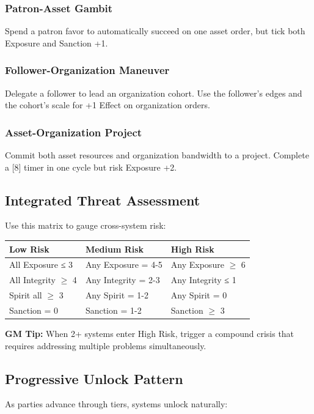 \documentclass[10pt]{article}
\begin{document}
    \subsubsection{Patron-Asset Gambit}
    Spend a patron favor to automatically succeed on one asset order, but tick both Exposure and Sanction +1.
    
    \subsubsection{Follower-Organization Maneuver}
    Delegate a follower to lead an organization cohort. Use the follower's edges and the cohort's scale for +1 Effect on organization orders.
    
    \subsubsection{Asset-Organization Project}
    Commit both asset resources and organization bandwidth to a project. Complete a [8] timer in one cycle but risk Exposure +2.
    
    \subsection{Integrated Threat Assessment}
    Use this matrix to gauge cross-system risk:
    
    \begin{longtable}{p{3cm}p{3cm}p{3cm}}
    \textbf{Low Risk} & \textbf{Medium Risk} & \textbf{High Risk} \\
    \hline
    All Exposure ≤ 3 & Any Exposure = 4-5 & Any Exposure $\geq$ 6 \\
    All Integrity $\geq$ 4 & Any Integrity = 2-3 & Any Integrity ≤ 1 \\
    Spirit all $\geq$ 3 & Any Spirit = 1-2 & Any Spirit = 0 \\
    Sanction = 0 & Sanction = 1-2 & Sanction $\geq$ 3 \\
    \end{longtable}
    
    \textbf{GM Tip:} When 2+ systems enter High Risk, trigger a compound crisis that requires addressing multiple problems simultaneously.
    
    \subsection{Progressive Unlock Pattern}
    As parties advance through tiers, systems unlock naturally:
    
\end{document}

